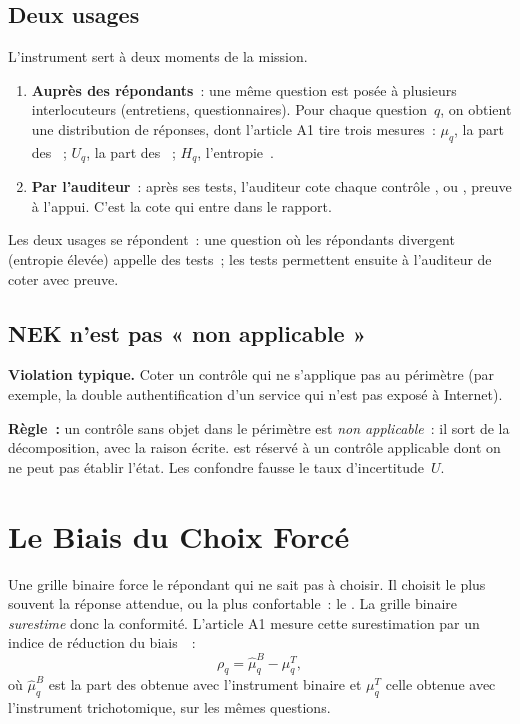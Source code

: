 \subsection{Deux usages}

L'instrument sert à deux moments de la mission.
\begin{enumerate}
    \item \textbf{Auprès des répondants}~: une même question est posée à
          plusieurs interlocuteurs (entretiens, questionnaires). Pour chaque
          question~$q$, on obtient une distribution de réponses, dont l'article
          A1 tire trois mesures~: $\mu_q$, la part des \OUI{}~; $U_q$, la part
          des \NEK{}~; $H_q$, l'entropie~\cite{minka2026nek}.
    \item \textbf{Par l'auditeur}~: après ses tests, l'auditeur cote chaque
          contrôle \OUI{}, \NON{} ou \NEK{}, preuve à l'appui. C'est la cote
          qui entre dans le rapport.
\end{enumerate}

Les deux usages se répondent~: une question où les répondants divergent
(entropie élevée) appelle des tests~; les tests permettent ensuite à
l'auditeur de coter avec preuve.

\subsection{NEK n'est pas « non applicable »}

\begin{boxalert}
\textbf{Violation typique.} Coter \NEK{} un contrôle qui ne s'applique pas au
périmètre (par exemple, la double authentification d'un service qui n'est
pas exposé à Internet).

\smallskip
\textbf{Règle~:} un contrôle sans objet dans le périmètre est \emph{non
applicable}~: il sort de la décomposition, avec la raison écrite. \NEK{} est
réservé à un contrôle applicable dont on ne peut pas établir l'état. Les
confondre fausse le taux d'incertitude~$U$.
\end{boxalert}

\section{Le Biais du Choix Forcé}
\label{sec:c08-biais}

Une grille binaire force le répondant qui ne sait pas à choisir. Il choisit
le plus souvent la réponse attendue, ou la plus confortable~: le \OUI{}. La
grille binaire \emph{surestime} donc la conformité. L'article A1 mesure cette
surestimation par un indice de réduction du biais~\cite{minka2026nek}~:
\[
    \rho_q = \hat{\mu}_q^{B} - \mu_q^{T},
\]
où $\hat{\mu}_q^{B}$ est la part des \OUI{} obtenue avec l'instrument binaire et
$\mu_q^{T}$ celle obtenue avec l'instrument trichotomique, sur les mêmes
questions.

